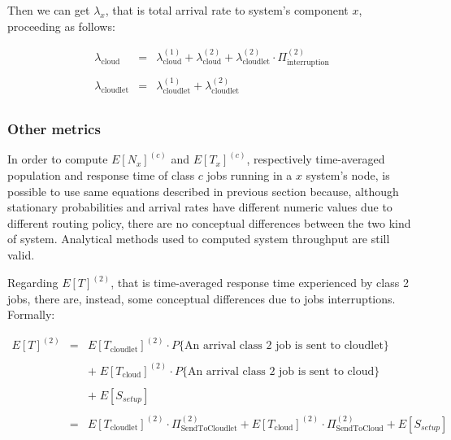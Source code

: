 \documentclass[10pt,a4paper]{article}
\begin{document}
Then we can get $\lambda_x$, that is total arrival rate to system's component $x$, proceeding as follows:

\begin{equation}
\begin{array} {rcl}

\lambda_{\text{cloud}} & = & \lambda_{\text{cloud}}^{(1)} + \lambda_{\text{cloud}}^{(2)} + \lambda_{\text{cloudlet}}^{(2)} \cdot \Pi_{\text{interruption}}^{(2)} \\\\

\lambda_{\text{cloudlet}} & = & \lambda_{\text{cloudlet}}^{(1)} + \lambda_{\text{cloudlet}}^{(2)} \\
\end{array}
\end{equation}

\subsubsection{Other metrics}

In order to compute $E[N_x]^{(c)}$ and $E[T_x]^{(c)}$, respectively time-averaged population and response time of class $c$ jobs running in a $x$ system's node, is possible to  use same equations described in previous section because, although stationary probabilities and arrival rates have different numeric values due to different routing policy, there are no conceptual differences between the two kind of system.
Analytical methods used to computed system throughput are still valid.

Regarding $E[T]^{(2)}$, that is time-averaged response time experienced by class 2 jobs, there are, instead, some conceptual differences due to jobs interruptions. Formally:

\begin{equation}
\begin{array} {lcl} 
E[T]^{(2)} & = & E[T_{\text{cloudlet}}]^{(2)} \cdot P\lbrace\text{An arrival class 2 job is sent to cloudlet}\rbrace \\
\\
& & +\; E[T_{\text{cloud}}]^{(2)}\cdot P\lbrace\text{An arrival class 2 job is sent to cloud}\rbrace \\
\\
& & +\; E[S_{setup}] \\
\\
& = & E[T_{\text{cloudlet}}]^{(2)}\cdot \Pi_{\text{SendToCloudlet}}^{(2)} + E[T_{\text{cloud}}]^{(2)}\cdot \Pi_{\text{SendToCloud}}^{(2)} + E[S_{setup}] \\

\end{array}
\end{equation}
\end{document}
